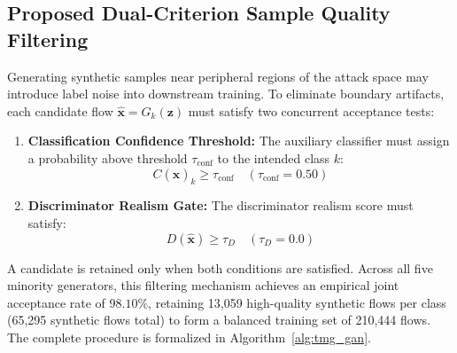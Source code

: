 \documentclass[conference]{IEEEtran}
\begin{document}
\subsection{Proposed Dual-Criterion Sample Quality Filtering}

Generating synthetic samples near peripheral regions of the attack space may introduce label noise into downstream training. To eliminate boundary artifacts, each candidate flow $\hat{\mathbf{x}} = G_k(\mathbf{z})$ must satisfy two concurrent acceptance tests:
\begin{enumerate}
    \item \textbf{Classification Confidence Threshold:} The auxiliary classifier must assign a probability above threshold $\tau_{\text{conf}}$ to the intended class $k$:
    \begin{equation}
    C(\hat{\mathbf{x}})_k \geq \tau_{\text{conf}} \quad (\tau_{\text{conf}} = 0.50)
    \end{equation}
    \item \textbf{Discriminator Realism Gate:} The discriminator realism score must satisfy:
    \begin{equation}
    D(\hat{\mathbf{x}}) \geq \tau_D \quad (\tau_D = 0.0)
    \end{equation}
\end{enumerate}
A candidate is retained only when both conditions are satisfied. Across all five minority generators, this filtering mechanism achieves an empirical joint acceptance rate of $98.10\%$, retaining 13,059 high-quality synthetic flows per class (65,295 synthetic flows total) to form a balanced training set of 210,444 flows. The complete procedure is formalized in Algorithm~\ref{alg:tmg_gan}.
\end{document}
